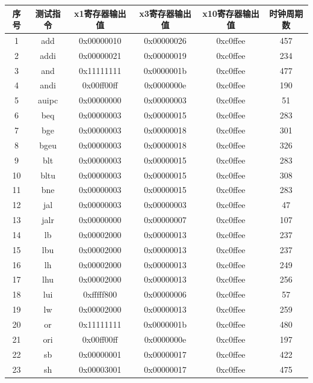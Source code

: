 \documentclass[12pt, a4paper]{ctexart}
\begin{document}
\begin{table}[H]
    \centering
    \small
    \begin{tabular}{cccccc}
        \hline
        序号 & 测试指令 & x1寄存器输出值 & x3寄存器输出值 & x10寄存器输出值 & 时钟周期数 \\
        \hline
        1 & add & 0x00000010 & 0x00000026 & 0xc0ffee & 457 \\
        2 & addi & 0x00000021 & 0x00000019 & 0xc0ffee & 234 \\
        3 & and & 0x11111111 & 0x0000001b & 0xc0ffee & 477 \\
        4 & andi & 0x00ff00ff & 0x0000000e & 0xc0ffee & 190 \\
        5 & auipc & 0x00000000 & 0x00000003 & 0xc0ffee & 51 \\
        6 & beq & 0x00000003 & 0x00000015 & 0xc0ffee & 283 \\
        7 & bge & 0x00000003 & 0x00000018 & 0xc0ffee & 301 \\
        8 & bgeu & 0x00000003 & 0x00000018 & 0xc0ffee & 326 \\
        9 & blt & 0x00000003 & 0x00000015 & 0xc0ffee & 283 \\
        10 & bltu & 0x00000003 & 0x00000015 & 0xc0ffee & 308 \\
        11 & bne & 0x00000003 & 0x00000015 & 0xc0ffee & 283 \\
        12 & jal & 0x00000003 & 0x00000003 & 0xc0ffee & 47 \\
        13 & jalr & 0x00000000 & 0x00000007 & 0xc0ffee & 107 \\
        14 & lb & 0x00002000 & 0x00000013 & 0xc0ffee & 237 \\
        15 & lbu & 0x00002000 & 0x00000013 & 0xc0ffee & 237 \\
        16 & lh & 0x00002000 & 0x00000013 & 0xc0ffee & 249 \\
        17 & lhu & 0x00002000 & 0x00000013 & 0xc0ffee & 256 \\
        18 & lui & 0xfffff800 & 0x00000006 & 0xc0ffee & 57 \\
        19 & lw & 0x00002000 & 0x00000013 & 0xc0ffee & 259 \\
        20 & or & 0x11111111 & 0x0000001b & 0xc0ffee & 480 \\
        21 & ori & 0x00ff00ff & 0x0000000e & 0xc0ffee & 197 \\
        22 & sb & 0x00000001 & 0x00000017 & 0xc0ffee & 422 \\
        23 & sh & 0x00003001 & 0x00000017 & 0xc0ffee & 475 \\

\end{tabular}
\end{table}
\end{document}
